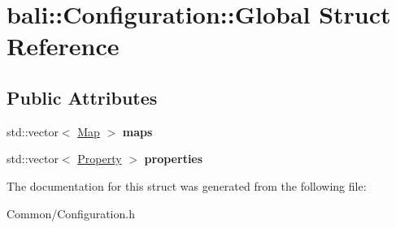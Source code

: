 \hypertarget{structbali_1_1_configuration_1_1_global}{\section{bali\-:\-:Configuration\-:\-:Global Struct Reference}
\label{structbali_1_1_configuration_1_1_global}
}
\subsection*{Public Attributes}
\begin{DoxyCompactItemize}
\item 
\hypertarget{structbali_1_1_configuration_1_1_global_a80f7ed7eb12a2826e9699b2043d09720}{std\-::vector$<$ \hyperlink{structbali_1_1_configuration_1_1_map}{Map} $>$ {\bfseries maps}}\label{structbali_1_1_configuration_1_1_global_a80f7ed7eb12a2826e9699b2043d09720}

\item 
\hypertarget{structbali_1_1_configuration_1_1_global_a45e9d725924febb023ca6eab356ec4fa}{std\-::vector$<$ \hyperlink{structbali_1_1_configuration_1_1_property}{Property} $>$ {\bfseries properties}}\label{structbali_1_1_configuration_1_1_global_a45e9d725924febb023ca6eab356ec4fa}

\end{DoxyCompactItemize}


The documentation for this struct was generated from the following file\-:\begin{DoxyCompactItemize}
\item 
Common/Configuration.\-h\end{DoxyCompactItemize}
